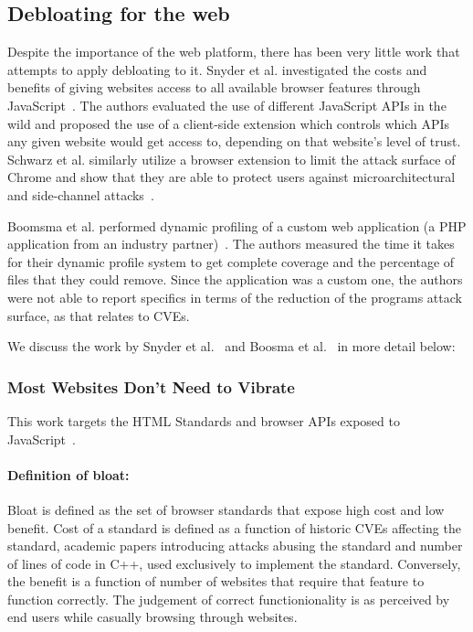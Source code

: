 \subsection{Debloating for the web}
Despite the importance of the web platform, there has been very little work that attempts to apply debloating to it. Snyder et al. investigated the costs and
benefits of giving websites access to all available browser features through
JavaScript~\cite{snyder2017vibrate}. The authors evaluated the use of different
JavaScript APIs in the wild and proposed the use of a client-side extension
which controls which APIs any given website would get access to, depending
on that website's level of trust. Schwarz et al. similarly utilize a browser
extension to limit the attack surface of Chrome and show that they are able
to protect users against microarchitectural and side-channel
attacks~\cite{Schwarz2018}.


Boomsma et al. performed dynamic profiling of a custom web application
(a PHP application from an industry partner)~\cite{boomsma2012Dead}. The
authors measured the time it takes for their dynamic profile system to get
complete coverage and the percentage of files that they could remove. Since the
application was a custom one, the authors were not able to report specifics
in terms of the reduction of the programs attack surface, as that relates
to CVEs.


We discuss the work by Snyder et al.~\cite{snyder2017vibrate} and Boosma et al.~\cite{boomsma2012Dead} in more detail below:

\subsubsection{Most Websites Don't Need to Vibrate}
This work targets the HTML Standards and browser APIs exposed to JavaScript~\cite{snyder2017vibrate}.
\paragraph{Definition of bloat:} Bloat is defined as the set of browser standards that expose high cost and low benefit. Cost of a standard is defined as a function of historic CVEs affecting the standard, academic papers introducing attacks abusing the standard and number of lines of code in C++, used exclusively to implement the standard. Conversely, the benefit is a function of number of websites that require that feature to function correctly. The judgement of correct functionionality is as perceived by end users while casually browsing through websites.
